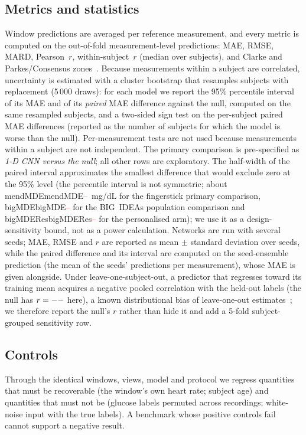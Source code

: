 \documentclass[journal]{IEEEtran}
\newcommand{\m}[1]{\ifcsname #1\endcsname\csname #1\endcsname\else\textcolor{red}{--}\fi}
\begin{document}
\subsection{Metrics and statistics}
\label{sec:stats}
Window predictions are averaged per reference measurement, and every metric
is computed on the out-of-fold measurement-level predictions: MAE, RMSE,
MARD, Pearson~$r$, within-subject~$r$ (median over subjects), and Clarke and
Parkes/Consensus zones~\cite{clarke1987,parkes2000}.  Because measurements
within a subject are correlated, uncertainty is estimated with a cluster
bootstrap that resamples subjects with replacement (5\,000 draws): for each
model we report the 95\% percentile interval of its MAE and of its
\emph{paired} MAE difference against the null, computed on the same resampled
subjects, and a two-sided sign test on the per-subject paired MAE
differences (reported as the number of subjects for which the model is worse
than the null).  Per-measurement tests are not used because measurements
within a subject are not independent.  The primary comparison is
pre-specified as \emph{1-D CNN versus the null}; all other rows are
exploratory.  The half-width of the paired interval approximates the
smallest difference that would exclude zero at the 95\% level (the
percentile interval is not symmetric; about
\m{mendMDE}~mg/dL for the fingerstick primary comparison, \m{bigMDE} for the
BIG~IDEAs population comparison and \m{bigMDERes} for the personalised arm);
we use it as a design-sensitivity bound, not as a power calculation.
Networks are run with several seeds; MAE, RMSE and $r$ are reported as mean
$\pm$ standard deviation over seeds, while the paired difference and its
interval are computed on the seed-ensemble prediction (the mean of the
seeds' predictions per measurement), whose MAE is given alongside.
Under leave-one-subject-out, a predictor that regresses toward its training
mean acquires a negative pooled correlation with the held-out labels (the null
has $r=\m{mendMeanR}$ here), a known distributional bias of leave-one-out
estimates~\cite{austin2025}; we therefore report the null's $r$ rather than
hide it and add a 5-fold subject-grouped sensitivity row.

\subsection{Controls}
\label{sec:controls}
Through the identical windows, views, model and protocol we regress
quantities that must be recoverable (the window's own heart rate; subject
age) and quantities that must not be (glucose labels permuted across
recordings; white-noise input with the true labels).  A benchmark whose
positive controls fail cannot support a negative result.
\end{document}
